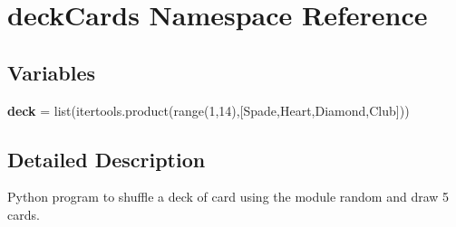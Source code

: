 \hypertarget{namespacedeckCards}{}\section{deck\+Cards Namespace Reference}
\label{namespacedeckCards}
\subsection*{Variables}
\begin{DoxyCompactItemize}
\item 
{\bfseries deck} = list(itertools.\+product(range(1,14),\mbox{[}\textquotesingle{}Spade\textquotesingle{},\textquotesingle{}Heart\textquotesingle{},\textquotesingle{}Diamond\textquotesingle{},\textquotesingle{}Club\textquotesingle{}\mbox{]}))\hypertarget{namespacedeckCards_a59da9736b74ba458978cd969e6563382}{}\label{namespacedeckCards_a59da9736b74ba458978cd969e6563382}

\end{DoxyCompactItemize}


\subsection{Detailed Description}
\begin{DoxyVerb}Python program to shuffle a deck of card using the module random and draw 5 cards. \end{DoxyVerb}
 